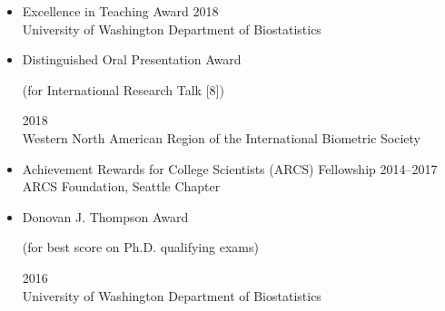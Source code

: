 \documentclass[margin]{res}
\begin{document}
\begin{resume}
\begin{itemize}
\item Excellence in Teaching Award  \hfill 2018 \\
University of Washington Department of Biostatistics
\item Distinguished Oral Presentation Award  \begin{footnotesize}(for International Research Talk [8])\end{footnotesize} \hfill 2018 \\ Western North American Region of the International Biometric Society  %
\item Achievement Rewards for College Scientists (ARCS) Fellowship \hfill 2014--2017 \\
ARCS Foundation, Seattle Chapter
\item Donovan J. Thompson Award \begin{footnotesize}(for best score on Ph.D. qualifying exams)\end{footnotesize} \hfill 2016 \\
University of Washington Department of Biostatistics %
\end{itemize}


\end{resume}
\end{document}
